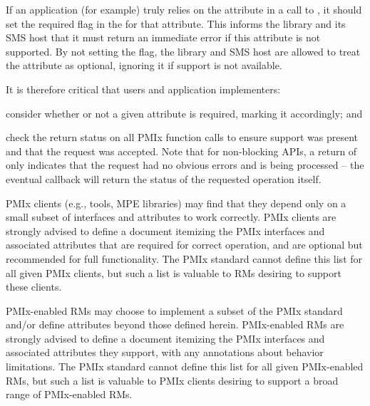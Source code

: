 
If an application (for example) truly relies on the  attribute in a call to , it should set the required flag in the  for that attribute. This informs the library and its \ac{SMS} host that it must return an immediate error if this attribute is not supported. By not setting the flag, the library and \ac{SMS} host are allowed to treat the attribute as optional, ignoring it if support is not available.

It is therefore critical that users and application implementers:

\begin{compactalphaenum}
\item consider whether or not a given attribute is required, marking it accordingly; and

\item check the return status on all \ac{PMIx} function calls to ensure support was present and that the request was accepted. Note that for non-blocking \acp{API}, a return of  only indicates that the request had no obvious errors and is being processed – the eventual callback will return the status of the requested operation itself.
\end{compactalphaenum}


\ac{PMIx} clients (e.g., tools, \ac{MPE} libraries) may find that they depend only on a small subset of interfaces and attributes to work correctly.
\ac{PMIx} clients are strongly advised to define a document itemizing the \ac{PMIx} interfaces and associated attributes that are required for correct operation, and are optional but recommended for full functionality.
The \ac{PMIx} standard cannot define this list for all given \ac{PMIx} clients, but such a list is valuable to \acp{RM} desiring to support these clients.

\ac{PMIx}-enabled \acp{RM} may choose to implement a subset of the \ac{PMIx} standard and/or define attributes beyond those defined herein.
\ac{PMIx}-enabled \acp{RM} are strongly advised to define a document itemizing the \ac{PMIx} interfaces and associated attributes they support, with any annotations about behavior limitations.
The \ac{PMIx} standard cannot define this list for all given \ac{PMIx}-enabled \acp{RM}, but such a list is valuable to \ac{PMIx} clients desiring to support a broad range of \ac{PMIx}-enabled \acp{RM}. 

